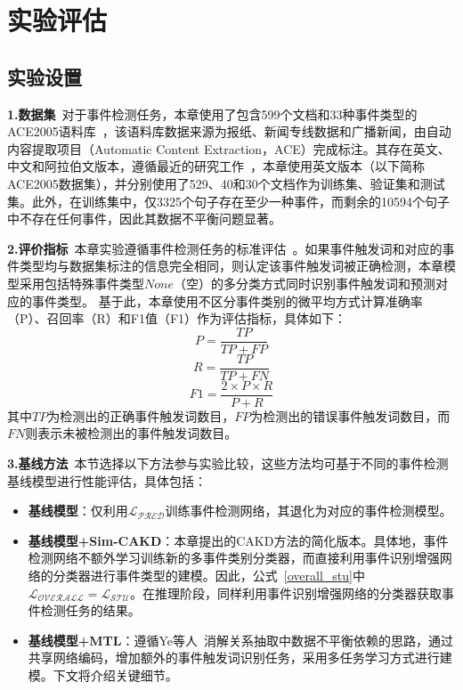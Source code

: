 \section{实验评估}

\subsection{实验设置}
\label{experiment_settings}
\textbf{1.数据集}~对于事件检测任务，本章使用了包含599个文档和33种事件类型的ACE2005语料库~\cite{doddington2004automatic}，该语料库数据来源为报纸、新闻专线数据和广播新闻，由自动内容提取项目（Automatic Content Extraction，ACE）完成标注。其存在英文、中文和阿拉伯文版本，遵循最近的研究工作~\cite{chen2015event,lu2019distilling}，本章使用英文版本（以下简称ACE2005数据集），并分别使用了529、40和30个文档作为训练集、验证集和测试集。此外，在训练集中，仅3325个句子存在至少一种事件，而剩余的10594个句子中不存在任何事件，因此其数据不平衡问题显著。

\textbf{2.评价指标}~本章实验遵循事件检测任务的标准评估~\cite{li2013joint,chen2015event}。如果事件触发词和对应的事件类型均与数据集标注的信息完全相同，则认定该事件触发词被正确检测，本章模型采用包括特殊事件类型$None$（空）的多分类方式同时识别事件触发词和预测对应的事件类型。
基于此，本章使用不区分事件类别的微平均方式计算准确率（P）、召回率（R）和F1值（F1）作为评估指标，具体如下：
\begin{equation}
   P=\frac{TP}{TP+FP}
\end{equation}
\begin{equation}
   R=\frac{TP}{TP+FN}
\end{equation}
\begin{equation}
   F1=\frac{2 \times P \times R}{P+R} 
\end{equation}
其中$TP$为检测出的正确事件触发词数目，$FP$为检测出的错误事件触发词数目，而$FN$则表示未被检测出的事件触发词数目。

\textbf{3.基线方法}~本节选择以下方法参与实验比较，这些方法均可基于不同的事件检测基线模型进行性能评估，具体包括：
\begin{itemize}
    \item \textbf{基线模型}：仅利用$\mathcal{L_\textrm{PRED}}$训练事件检测网络，其退化为对应的事件检测模型。
    \item \textbf{基线模型+Sim-CAKD}：本章提出的CAKD方法的简化版本。具体地，事件检测网络不额外学习训练新的多事件类别分类器，而直接利用事件识别增强网络的分类器进行事件类型的建模。因此，公式~\ref{overall_stu}中$\mathcal{L_\textrm{OVERALL}} = \mathcal{L_\textrm{STU}}$。在推理阶段，同样利用事件识别增强网络的分类器获取事件检测任务的结果。
    \item \textbf{基线模型+MTL}：遵循Ye等人~\cite{ye2019exploiting}消解关系抽取中数据不平衡依赖的思路，通过共享网络编码，增加额外的事件触发词识别任务，采用多任务学习方式进行建模。下文将介绍关键细节。
\end{itemize}

